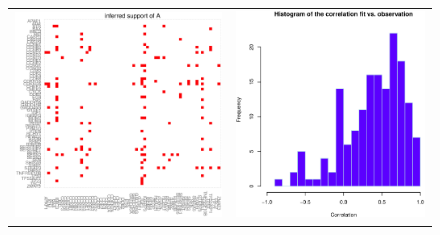 \begin{figure}[h!]
\centering
\begin{tabular}{cc}
\includegraphics[scale=0.4, angle=0]{Ahat_support.eps}
&
\includegraphics[scale=0.4, angle=0]{correlationFit2Obs.eps}

\end{tabular}
\end{figure}
